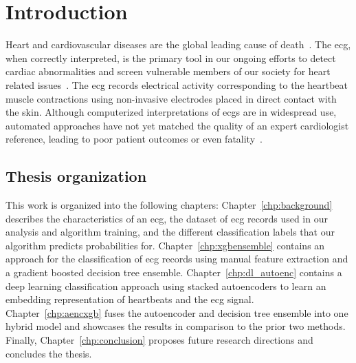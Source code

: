 \documentclass[\main/thesis.tex]{subfiles}
\begin{document}
\chapter{Introduction}

Heart and cardiovascular diseases are the global leading cause of death~\cite{doi:10.1161/CIR.0000000000000757}.
The \gls{ecg}, when correctly interpreted, is the primary tool in our ongoing efforts to detect cardiac abnormalities and screen vulnerable members of our society for heart related issues~\cite{SMULYAN2019153}.
The \gls{ecg} records electrical activity corresponding to the heartbeat muscle contractions using non-invasive electrodes placed in direct contact with the skin.
Although computerized interpretations of \gls{ecg}s are in widespread use, automated approaches have not yet matched the quality of an expert cardiologist reference, leading to poor patient outcomes or even fatality~\cite{BREEN2019}.

\section{Thesis organization}

This work is organized into the following chapters:
Chapter~\ref{chp:background} describes the characteristics of an \gls{ecg}, the dataset of \gls{ecg} records used in our analysis and algorithm training, and the different classification labels that our algorithm predicts probabilities for.
Chapter~\ref{chp:xgbensemble} contains an approach for the classification of \gls{ecg} records using manual feature extraction and a gradient boosted decision tree ensemble.
Chapter~\ref{chp:dl_autoenc} contains a deep learning classification approach using stacked autoencoders to learn an embedding representation of heartbeats and the \gls{ecg} signal.
Chapter~\ref{chp:aencxgb} fuses the autoencoder and decision tree ensemble into one hybrid model and showcases the results in comparison to the prior two methods.
Finally, Chapter~\ref{chp:conclusion} proposes future research directions and concludes the thesis.



\end{document}
